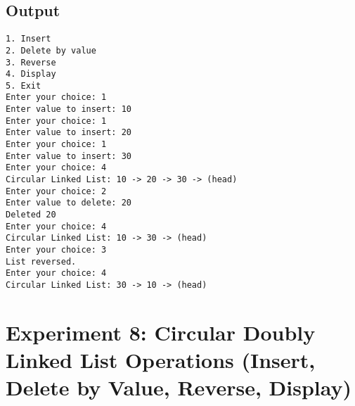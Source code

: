\documentclass[12pt,a4paper]{article}
\begin{document}
\subsection*{Output}
\begin{tcolorbox}[terminalstyle, title=Sample Output]
\texttt{1. Insert\\2. Delete by value\\3. Reverse\\4. Display\\5. Exit\\
Enter your choice: 1\\
Enter value to insert: 10\\
Enter your choice: 1\\
Enter value to insert: 20\\
Enter your choice: 1\\
Enter value to insert: 30\\
Enter your choice: 4\\
Circular Linked List: 10 -> 20 -> 30 -> (head)\\
Enter your choice: 2\\
Enter value to delete: 20\\
Deleted 20\\
Enter your choice: 4\\
Circular Linked List: 10 -> 30 -> (head)\\
Enter your choice: 3\\
List reversed.\\
Enter your choice: 4\\
Circular Linked List: 30 -> 10 -> (head)}
\end{tcolorbox}

\newpage
\section*{Experiment 8: Circular Doubly Linked List Operations (Insert, Delete by Value, Reverse, Display)}
\end{document}
